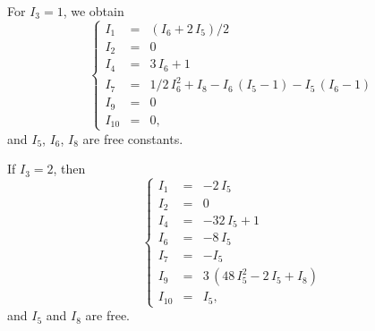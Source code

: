 \noindent
For $I_{3}=1$, we obtain 
\begin{equation} \left\{
\begin{array}{lll}
I_{1}&=&(I_{6} + 2\,I_{5})/2 \\
I_{2}&=&0 \\
I_{4}&=&3\,I_{6} + 1 \\
I_{7}&=&1/2\,I_{6}^{2}+I_{8}-I_{6}\,(I_{5}-1)-I_{5}\,(I_{6}-1) \\
I_{9}&=&0 \\
I_{10}&=&0,
\end{array} \right.
\end{equation}
and $I_{5}$, $I_{6}$, $I_{8}$ are free constants.

\noindent
If $I_{3}=2$, then
\begin{equation} \left\{
\begin{array}{lll}
I_{1}&=& - 2\,I_{5} \\
I_{2}&=&0 \\
I_{4}&=& - 32\,I_{5} + 1 \\
I_{6}&=&-8\,I_{5} \\
I_{7}&=&-I_{5} \\
I_{9}&=&3\,(48\,I_{5}^{2} - 2\,I_{5} + I_{8}) \\
I_{10}&=&I_{5}, 
\end{array} \right.
\end{equation}
and $I_{5}$ and $I_{8}$ are free.


